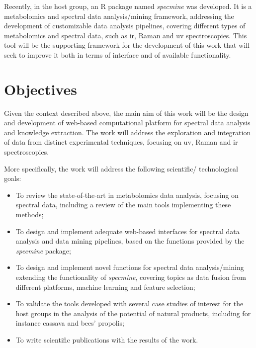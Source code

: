 Recently, in the host group, an R package named \textit{specmine} \citep{costa2016r} was developed. It is a metabolomics and spectral data analysis/mining framework, addressing the development of customizable data analysis pipelines, covering different types of metabolomics and spectral data, such as \gls{ir}, Raman and \gls{uv} spectroscopies. This tool will be the supporting framework for the development of this work that will seek to improve it both in terms of interface and of available functionality.


\section{Objectives}

Given the context described above, the main aim of this work will be the design and development of web-based computational platform for spectral data analysis and knowledge extraction. The work will address the exploration and integration of data from distinct experimental techniques, focusing on \gls{uv}, Raman and \gls{ir} spectroscopies. 

More specifically, the work will address the following scientific/ technological goals:

\begin{itemize}
	\item To review the state-of-the-art in metabolomics data analysis, focusing on spectral data, including a review of the main tools implementing these methods;
	\item To design and implement adequate web-based interfaces for spectral data analysis and data mining pipelines, based on the functions provided by the \textit{specmine} package;
	\item To design and implement novel functions for spectral data analysis/mining extending the functionality of \textit{specmine}, covering topics as data fusion from different platforms, machine learning and feature selection;
	\item To validate the tools developed with several case studies of interest for the host groups in the analysis of the potential of natural products, including for instance cassava and bees’ propolis;
	\item To write scientific publications with the results of the work.
\end{itemize}


